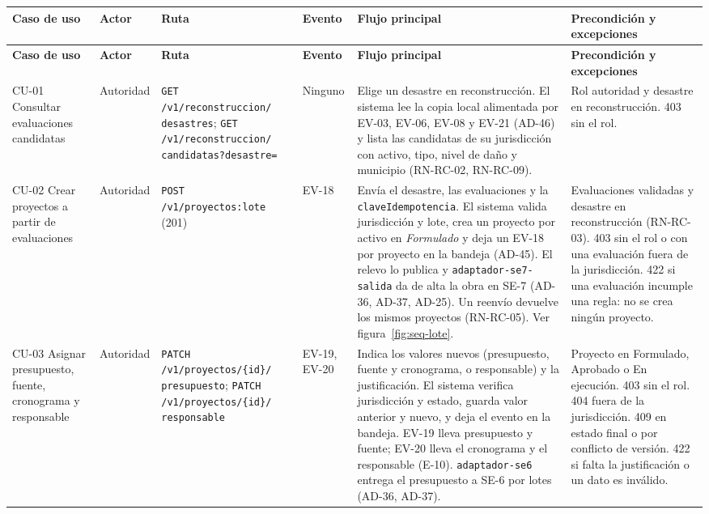 \documentclass[11pt,a4paper]{article}
\begin{document}
{\small
\begin{longtable}{|P{1.8cm}|P{1.9cm}|P{3.1cm}|P{1.2cm}|P{3.3cm}|P{2.9cm}|}
  \hline
  \textbf{Caso de uso} & \textbf{Actor} & \textbf{Ruta} & \textbf{Evento} &
  \textbf{Flujo principal} & \textbf{Precondición y excepciones} \\ \hline
  \endfirsthead
  \hline
  \textbf{Caso de uso} & \textbf{Actor} & \textbf{Ruta} & \textbf{Evento} &
  \textbf{Flujo principal} & \textbf{Precondición y excepciones} \\ \hline
  \endhead
  CU-01 Consultar evaluaciones candidatas & Autoridad
    & {\footnotesize\texttt{GET /v1/reconstruccion/ desastres}}; {\footnotesize\texttt{GET /v1/reconstruccion/ candidatas?desastre=}}
    & Ninguno
    & Elige un desastre en reconstrucción. El sistema lee la copia local alimentada por EV-03, EV-06, EV-08 y
      EV-21 (AD-46) y lista las candidatas de su jurisdicción con activo, tipo, nivel de daño y municipio
      (RN-RC-02, RN-RC-09).
    & Rol autoridad y desastre en reconstrucción. 403 sin el rol. \\ \hline
  CU-02 Crear proyectos a partir de evaluaciones & Autoridad
    & {\footnotesize\texttt{POST /v1/proyectos:lote}} (201)
    & EV-18
    & Envía el desastre, las evaluaciones y la \texttt{claveIdempotencia}. El sistema valida jurisdicción y lote,
      crea un proyecto por activo en \emph{Formulado} y deja un EV-18 por proyecto en la bandeja (AD-45). El relevo
      lo publica y \texttt{adaptador-se7-salida} da de alta la obra en SE-7 (AD-36, AD-37, AD-25). Un reenvío
      devuelve los mismos proyectos (RN-RC-05). Ver figura~\ref{fig:seq-lote}.
    & Evaluaciones validadas y desastre en reconstrucción (RN-RC-03). 403 sin el rol o con una evaluación fuera de la jurisdicción. 422 si una evaluación incumple una regla: no se crea ningún proyecto. \\ \hline
  CU-03 Asignar presupuesto, fuente, cronograma y responsable & Autoridad
    & {\footnotesize\texttt{PATCH /v1/proyectos/\{id\}/ presupuesto}}; {\footnotesize\texttt{PATCH /v1/proyectos/\{id\}/ responsable}}
    & EV-19, EV-20
    & Indica los valores nuevos (presupuesto, fuente y cronograma, o responsable) y la justificación. El sistema
      verifica jurisdicción y estado, guarda valor anterior y nuevo, y deja el evento en la bandeja. EV-19 lleva
      presupuesto y fuente; EV-20 lleva el cronograma y el responsable (E-10). \texttt{adaptador-se6} entrega el
      presupuesto a SE-6 por lotes (AD-36, AD-37).
    & Proyecto en Formulado, Aprobado o En ejecución. 403 sin el rol. 404 fuera de la jurisdicción. 409 en estado final o por conflicto de versión. 422 si falta la justificación o un dato es inválido. \\ \hline

\end{longtable}}
\end{document}
